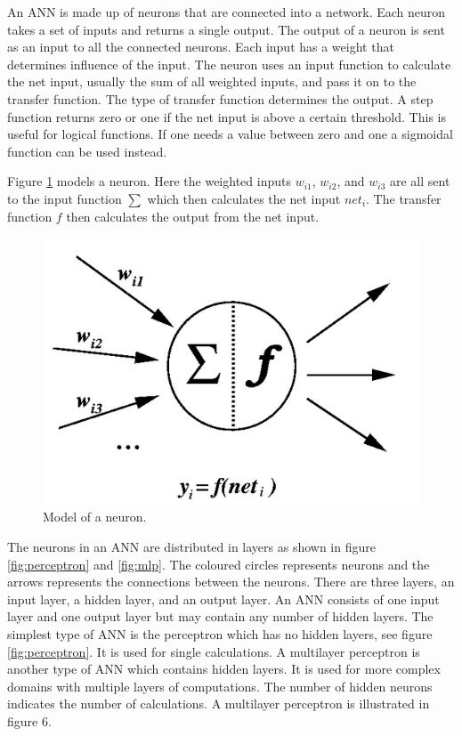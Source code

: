 An ANN is made up of neurons that are connected into a network. Each neuron takes a set of inputs and returns a single output. The output of a neuron is sent as an input to all the connected neurons. Each input has a weight that determines influence of the input. The neuron uses an input function to calculate the net input, usually the sum of all weighted inputs, and pass it on to the transfer function. The type of transfer function determines the output. A step function returns zero or one if the net input is above a certain threshold. This is useful for logical functions. If one needs a value between zero and one a sigmoidal function can be used instead.

Figure \ref{fig:neuron} models a neuron. Here the weighted inputs $w_{i1}$, $w_{i2}$, and $w_{i3}$ are all sent to the input function $\sum$ which then calculates the net input $net_{i}$. The transfer function $f$ then calculates the output from the net input.

\begin{figure}[H]
  \center
    \includegraphics[scale=0.4]{images/nn/neuron.png}
  \caption{Model of a neuron.\cite{neuron} \label{fig:neuron}}
\end{figure}

The neurons in an ANN are distributed in layers as shown in figure \ref{fig:perceptron} and \ref{fig:mlp}. The coloured circles represents neurons and the arrows represents the connections between the neurons. There are three layers, an input layer, a hidden layer, and an output layer. An ANN consists of one input layer and one output layer but may contain any number of hidden layers. The simplest type of ANN is the perceptron which has no hidden layers, see figure \ref{fig:perceptron}. It is used for single calculations. A multilayer perceptron is another type of ANN which contains hidden layers. It is used for more complex domains with multiple layers of computations. The number of hidden neurons indicates the number of calculations. A multilayer perceptron is illustrated in figure 6.

